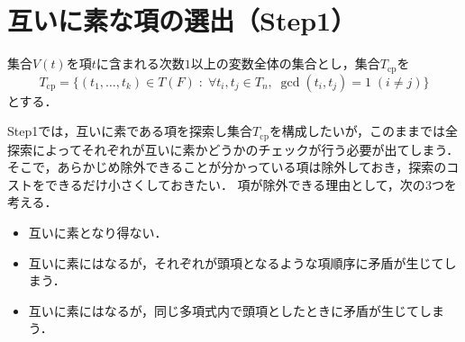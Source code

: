 \section{互いに素な項の選出（Step1）}
集合$V(t)$を項$t$に含まれる次数$1$以上の変数全体の集合とし，集合$T_{\mathrm{cp}}$を
$$
T_{\mathrm{cp}} = \{ (t_1, \dots, t_k)\in T(F) \;:\; \forall t_i, t_j \in T_n, \; \gcd(t_i,  t_j)=1\; (i\ne j) \}
$$
とする．
\par
Step1では，互いに素である項を探索し集合$T_{\mathrm{cp}}$を構成したいが，このままでは全探索によってそれぞれが互いに素かどうかのチェックが行う必要が出てしまう．
そこで，あらかじめ除外できることが分かっている項は除外しておき，探索のコストをできるだけ小さくしておきたい．
項が除外できる理由として，次の$3$つを考える．
\begin{itemize}
	\item 互いに素となり得ない．
	\item 互いに素にはなるが，それぞれが頭項となるような項順序に矛盾が生じてしまう．
	\item 互いに素にはなるが，同じ多項式内で頭項としたときに矛盾が生じてしまう．
\end{itemize}
